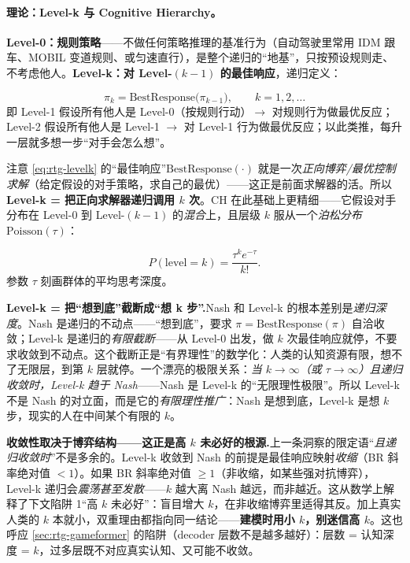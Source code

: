 \paragraph{理论：Level-k 与 Cognitive Hierarchy。}
\textbf{Level-0：规则策略}——不做任何策略推理的基准行为（自动驾驶里常用 IDM 跟车、MOBIL 变道规则、或匀速直行），是整个递归的“地基”，只按预设规则走、不考虑他人。\textbf{Level-k：对 Level-$(k-1)$ 的最佳响应}，递归定义：

\begin{definition}[Level-k 策略]\label{def:rtg-levelk}
\begin{equation}
  \pi_k=\mathrm{BestResponse}\big(\pi_{k-1}\big),\qquad k=1,2,\dots
  \label{eq:rtg-levelk}
\end{equation}
即 Level-1 假设所有他人是 Level-0（按规则行动）$\to$ 对规则行为做最优反应；Level-2 假设所有他人是 Level-1 $\to$ 对 Level-1 行为做最优反应；以此类推，每升一层就多想一步“对手会怎么想”。
\end{definition}

\noindent 注意 \cref{eq:rtg-levelk} 的“最佳响应”$\mathrm{BestResponse}(\cdot)$ 就是一次\emph{正向博弈/最优控制求解}（给定假设的对手策略，求自己的最优）——这正是前面求解器的活。所以 \textbf{Level-k = 把正向求解器递归调用 $k$ 次}。CH 在此基础上更精细——它假设对手分布在 Level-0 到 Level-$(k-1)$ 的\emph{混合}上，且层级 $k$ 服从一个\emph{泊松分布} $\mathrm{Poisson}(\tau)$：

\begin{equation}
  P(\text{level}=k)=\frac{\tau^k e^{-\tau}}{k!}.
  \label{eq:rtg-poisson}
\end{equation}
参数 $\tau$ 刻画群体的平均思考深度。

\begin{insight}
\textbf{Level-k = 把“想到底”截断成“想 k 步”.}\;Nash 和 Level-k 的根本差别是\emph{递归深度}。Nash 是递归的不动点——“想到底”，要求 $\pi=\mathrm{BestResponse}(\pi)$ 自洽收敛；Level-k 是递归的\emph{有限截断}——从 Level-0 出发，做 $k$ 次最佳响应就停，不要求收敛到不动点。这个截断正是“有界理性”的数学化：人类的认知资源有限，想不了无限层，到第 $k$ 层就停。一个漂亮的极限关系：\emph{当 $k\to\infty$（或 $\tau\to\infty$）且递归收敛时，Level-k 趋于 Nash}——Nash 是 Level-k 的“无限理性极限”。所以 Level-k 不是 Nash 的对立面，而是它的\emph{有限理性推广}：Nash 是想到底，Level-k 是想 $k$ 步，现实的人在中间某个有限的 $k$。
\end{insight}

\begin{insight}
\textbf{收敛性取决于博弈结构——这正是高 $k$ 未必好的根源.}\;上一条洞察的限定语“\emph{且递归收敛时}”不是多余的。Level-k 收敛到 Nash 的前提是最佳响应映射\emph{收缩}（BR 斜率绝对值 $<1$）。如果 BR 斜率绝对值 $\ge1$（非收缩，如某些强对抗博弈），Level-k 递归会\emph{震荡甚至发散}——$k$ 越大离 Nash 越远，而非越近。这从数学上解释了下文陷阱 1“高 $k$ 未必好”：盲目增大 $k$，在非收缩博弈里适得其反。加上真实人类的 $k$ 本就小，双重理由都指向同一结论——\textbf{建模时用小 $k$，别迷信高 $k$}。这也呼应 \cref{sec:rtg-gameformer} 的陷阱（decoder 层数不是越多越好）：层数 = 认知深度 = $k$，过多层既不对应真实认知、又可能不收敛。
\end{insight}

